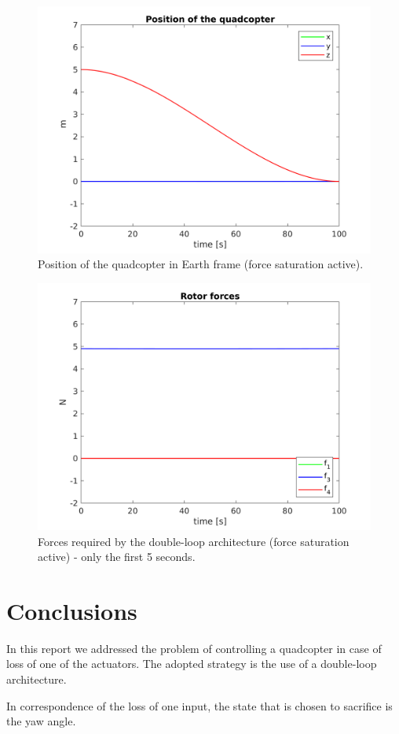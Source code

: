 \documentclass[11pt,a4paper]{scrartcl}
\begin{document}
\begin{figure}[H]
	\centering
	\includegraphics[width=0.7\linewidth]{Images/Position_SetPoint}
	\caption{Position of the quadcopter in Earth frame (force saturation active).}
	\label{fig:positionsetpoint}
\end{figure}

\begin{figure}
	\centering
	\includegraphics[width=0.7\linewidth]{Images/Forces_SetPoint}
	\caption{Forces required by the double-loop architecture (force saturation active) - only the first 5 seconds.}
	\label{fig:forcessetpoint}
\end{figure}

\section{Conclusions}

In this report we addressed the problem of controlling a quadcopter in case of loss of one of the actuators. The adopted strategy is the use of a double-loop architecture. 

In correspondence of the loss of one input, the state that is chosen to sacrifice is the yaw angle.
\end{document}
